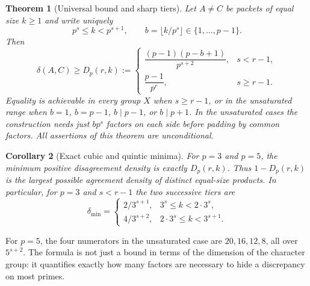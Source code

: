 \documentclass[11pt]{article}
\newtheorem{theorem}{Theorem}[section]
\newtheorem{corollary}[theorem]{Corollary}
\theoremstyle{definition}\newtheorem{definition}[theorem]{Definition}
\theoremstyle{remark}\newtheorem{remark}[theorem]{Remark}
\begin{document}
\begin{theorem}[Universal bound and sharp tiers]\label{thm:main}
Let $A\ne C$ be packets of equal size $k\ge1$ and write uniquely
\[
 p^s\le k<p^{s+1},\qquad b=\lfloor k/p^s\rfloor\in\{1,\ldots,p-1\}.
\]
Then
\begin{equation}\label{eq:delta}
 \delta(A,C)\ge D_p(r,k):=
 \begin{cases}
 \dfrac{(p-1)(p-b+1)}{p^{s+2}},&s<r-1,\\[5pt]
 \dfrac{p-1}{p^r},&s\ge r-1.
 \end{cases}
\end{equation}
Equality is achievable in every group $X$ when $s\ge r-1$, or in the unsaturated range when $b=1$, $b=p-1$, $b\mid p-1$, or $b\mid p+1$. In the unsaturated cases the construction needs just $bp^s$ factors on each side before padding by common factors. All assertions of this theorem are unconditional.
\end{theorem}

\begin{corollary}[Exact cubic and quintic minima]\label{cor:exact}
For $p=3$ and $p=5$, the minimum positive disagreement density is exactly $D_p(r,k)$. Thus $1-D_p(r,k)$ is the largest possible agreement density of distinct equal-size products. In particular, for $p=3$ and $s<r-1$ the two successive tiers are
\[
 \delta_{\min}=\begin{cases}
 2/3^{s+1},&3^s\le k<2\cdot3^s,\\
 4/3^{s+2},&2\cdot3^s\le k<3^{s+1}.
 \end{cases}
\]
\end{corollary}
For $p=5$, the four numerators in the unsaturated case are $20,16,12,8$, all over $5^{s+2}$. The formula is not just a bound in terms of the dimension of the character group: it quantifies exactly how many factors are necessary to hide a discrepancy on most primes.
\end{document}
